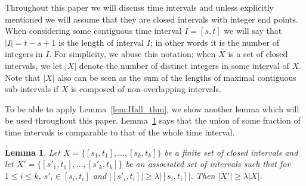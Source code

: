 \documentclass[11pt]{article}
\newtheorem{lemma}{Lemma}[section]
\begin{document}
\begin{titlepage}
Throughout this paper we will discuss time intervals and unless explicitly mentioned we will assume that they are
closed intervals with integer end points. When considering some contiguous time interval $I=[s,t]$ we will say that
$|I|=t-s+1$ is the length of interval $I$; in other words it is the number of integers in $I$. For simplicity, we abuse
this notation; when $X$ is a set of closed intervals, we let $|X|$ denote the number of distinct integers in some
interval of $X$. Note that $|X|$ also can be seen as the sum of the lengths of maximal contiguous sub-intervals if $X$
is composed of non-overlapping intervals.

\iffalse
 If $I$ is not contiguous, then let $|I|$ be sum of the lengths of the maximal contiguous sub-intervals of $I$.
\fi


To be able to apply Lemma~\ref{lem:Hall_thm}, we show another lemma which will be used throughout
this paper. Lemma~\ref{lem:intervals} says that the union of some fraction of time intervals is comparable to that of the whole
time interval.


\begin{lemma}
\label{lem:intervals} Let $X = \{[s_1,t_1], \ldots, [s_k,t_k]\}$ be a finite set of closed intervals and let $X' =
\{[s'_1,t_1], \ldots, [s'_k,t_k]\}$ be an associated set of intervals such that for $1 \le i \le k$, $s'_i \in
[s_i,t_i]$ and $|[s'_i,t_i]| \ge \lambda |[s_i,t_i]|$. Then $|X'| \ge \lambda |X|$.
\end{lemma}



\end{titlepage}
\end{document}
